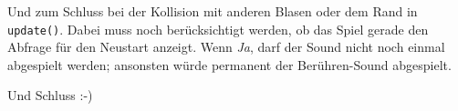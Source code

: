 
Und zum Schluss bei der Kollision mit anderen Blasen oder dem Rand in \texttt{update()}. Dabei muss noch berücksichtigt werden, ob das Spiel gerade den Abfrage für den Neustart anzeigt. Wenn \emph{Ja}, darf der Sound nicht noch einmal abgespielt werden; ansonsten würde permanent der Berühren-Sound abgespielt. 


Und Schluss :-)

